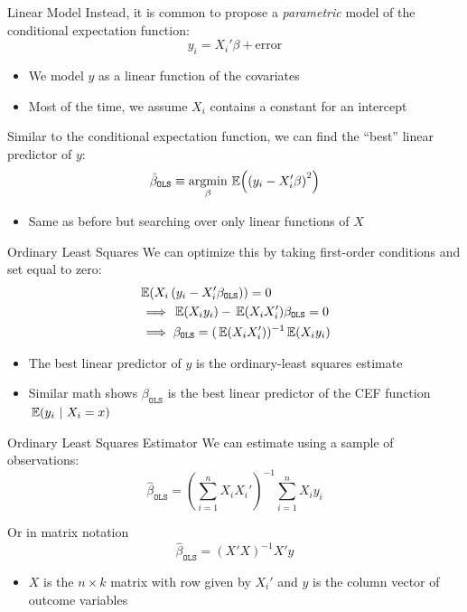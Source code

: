 \documentclass[aspectratio=169,t,11pt,table]{beamer}
\begin{document}
\begin{frame}{Linear Model}
  Instead, it is common to propose a \emph{parametric} model of the conditional expectation function:
  $$
    y_i = X_i' \beta + \text{error}
  $$
  \begin{itemize}
    \item We model $y$ as a linear function of the covariates
    \item Most of the time, we assume $X_i$ contains a constant for an intercept
  \end{itemize}

  \pause
  \bigskip
  Similar to the conditional expectation function, we can find the ``best'' linear predictor of $y$:
  $$
    \hat{\beta}_{\texttt{OLS}} \equiv \argmin_{\beta} \expec{\left( y_i - X_i' \beta \right)^2}
  $$
  \begin{itemize}
    \item Same as before but searching over only linear functions of $X$
  \end{itemize}
\end{frame}

\begin{frame}{Ordinary Least Squares}
  We can optimize this by taking first-order conditions and set equal to zero:
  \begin{align*}
    &\expec{ X_i \left( y_i - X_i' \beta_{\texttt{OLS}} \right) } = 0 \\
    &\implies \expec{ X_i y_i } - \expec{X_i X_i'} \beta_{\texttt{OLS}} = 0 \\
    &\implies \beta_{\texttt{OLS}} = (\expec{X_i X_i'})^{-1} \expec{ X_i y_i }
  \end{align*}

  \begin{itemize}
    \item The best linear predictor of $y$ is the ordinary-least squares estimate 
    
    \item Similar math shows $\beta_{\texttt{OLS}}$ is the best linear predictor of the CEF function $\expec{y_i}{X_i = x}$
  \end{itemize}
\end{frame}

\begin{frame}{Ordinary Least Squares Estimator}
  We can estimate using a sample of observations:
  $$
    \hat{\beta}_{\texttt{OLS}} = \left( \sum_{i=1}^n X_i X_i' \right)^{-1} \sum_{i=1}^n X_i y_i
  $$

  \bigskip
  Or in matrix notation
  $$
    \hat{\beta}_{\texttt{OLS}} = (X' X)^{-1} X' y
  $$
  \begin{itemize}
    \item $X$ is the $n \times k$ matrix with row given by $X_i'$ and $y$ is the column vector of outcome variables
  \end{itemize}
\end{frame}
\end{document}
